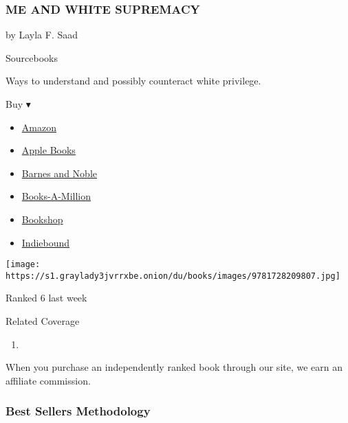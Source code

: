 \begin{enumerate}
  \hypertarget{me-and-white-supremacy}{%
  \subsubsection{ME AND WHITE SUPREMACY}\label{me-and-white-supremacy}}

  by Layla F. Saad

  Sourcebooks

  Ways to understand and possibly counteract white privilege.

  Buy ▾

  \begin{itemize}
  \tightlist
  \item
    \href{https://www.amazon.com/Me-White-Supremacy-Combat-Ancestor/dp/1728209803?tag=NYTBS-20}{Amazon}
  \item
    \href{https://du-gae-books-dot-nyt-du-prd.appspot.com/buy?title=ME+AND+WHITE+SUPREMACY\&author=Layla+F+Saad}{Apple
    Books}
  \item
    \href{https://www.anrdoezrs.net/click-7990613-11819508?url=https\%3A\%2F\%2Fwww.barnesandnoble.com\%2Fw\%2F\%3Fean\%3D9781728209807}{Barnes
    and Noble}
  \item
    \href{https://www.anrdoezrs.net/click-7990613-35140?url=https\%3A\%2F\%2Fwww.booksamillion.com\%2Fp\%2FME\%2BAND\%2BWHITE\%2BSUPREMACY\%2FLayla\%2BF\%2BSaad\%2F9781728209807}{Books-A-Million}
  \item
    \href{https://bookshop.org/a/3546/9781728209807}{Bookshop}
  \item
    \href{https://www.indiebound.org/book/9781728209807?aff=NYT}{Indiebound}
  \end{itemize}

  \texttt{[image: https://s1.graylady3jvrrxbe.onion/du/books/images/9781728209807.jpg]}

  Ranked 6 last week
\end{enumerate}

Related Coverage

\begin{enumerate}
\def\labelenumi{\arabic{enumi}.}
\tightlist
\item
  \href{https://www.nytimes3xbfgragh.onion/2020/07/31/books/review/the-system-robert-reich-break-em-up-zephyr-teachout.html}{}
\end{enumerate}

When you purchase an independently ranked book through our site, we earn
an affiliate commission.

\hypertarget{best-sellers-methodology}{%
\subsubsection{Best Sellers
Methodology}\label{best-sellers-methodology}}

